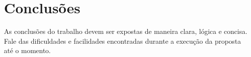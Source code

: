 \chapter{Conclusões}

As conclusões do trabalho devem ser expostas de maneira clara, lógica e concisa. Fale das dificuldades e facilidades encontradas durante a execução da proposta até o momento.